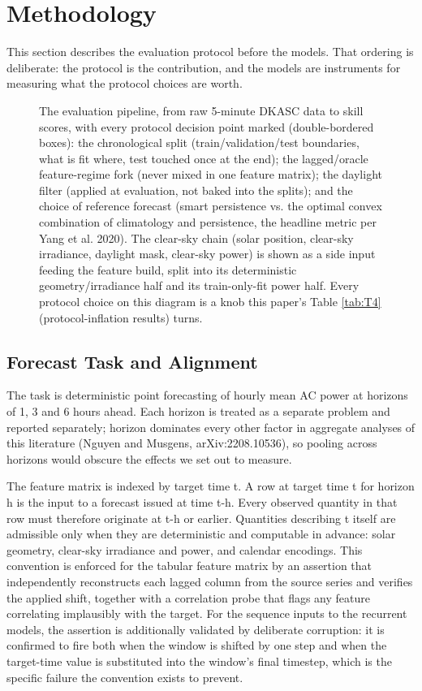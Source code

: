 \section{Methodology}

This section describes the evaluation protocol before the models. That
ordering is deliberate: the protocol is the contribution, and the models
are instruments for measuring what the protocol choices are worth.

\begin{figure}[t]
  \centering
  \resizebox{\textwidth}{!}{}
  \caption{The evaluation pipeline, from raw 5-minute DKASC data to skill
  scores, with every protocol decision point marked (double-bordered
  boxes): the chronological split (train/validation/test boundaries,
  what is fit where, test touched once at the end); the lagged/oracle
  feature-regime fork (never mixed in one feature matrix); the daylight
  filter (applied at evaluation, not baked into the splits); and the
  choice of reference forecast (smart persistence vs. the optimal convex
  combination of climatology and persistence, the headline metric per
  Yang et al. 2020). The clear-sky chain (solar position, clear-sky
  irradiance, daylight mask, clear-sky power) is shown as a side input
  feeding the feature build, split into its deterministic
  geometry/irradiance half and its train-only-fit power half. Every
  protocol choice on this diagram is a knob this paper's Table \ref{tab:T4}
  (protocol-inflation results) turns.}
  \label{fig:F7}
\end{figure}

\subsection{Forecast Task and Alignment}

The task is deterministic point forecasting of hourly mean AC power at
horizons of 1, 3 and 6 hours ahead. Each horizon is treated as a
separate problem and reported separately; horizon dominates every other
factor in aggregate analyses of this literature (Nguyen and Musgens,
arXiv:2208.10536), so pooling across horizons would obscure the effects we set out to
measure.

The feature matrix is indexed by target time t. A row at target time t
for horizon h is the input to a forecast issued at time t-h. Every
observed quantity in that row must therefore originate at t-h or
earlier. Quantities describing t itself are admissible only when they
are deterministic and computable in advance: solar geometry, clear-sky
irradiance and power, and calendar encodings. This convention is
enforced for the tabular feature matrix by an assertion that
independently reconstructs each lagged column from the source series and
verifies the applied shift, together with a correlation probe that
flags any feature correlating implausibly with the target. For the
sequence inputs to the recurrent models, the assertion is additionally
validated by deliberate corruption: it is confirmed to fire both when
the window is shifted by one step and when the target-time value is
substituted into the window's final timestep, which is the specific
failure the convention exists to prevent.

